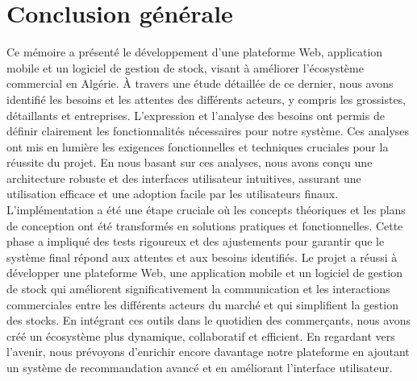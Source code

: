 \documentclass[edit,12pt,a4paper,ChapStyle,oneside,doubleinterligne]{report}
\begin{document}
\chapter{Conclusion générale}
Ce mémoire a présenté le développement d'une plateforme Web, application mobile et un logiciel de gestion de stock, visant à améliorer l'écosystème commercial en Algérie. À travers une étude détaillée de ce dernier, nous avons identifié les besoins et les attentes des différents acteurs, y compris les grossistes, détaillants et entreprises.
\newline\newline
L'expression et l'analyse des besoins ont permis de définir clairement les fonctionnalités nécessaires pour notre système. Ces analyses ont mis en lumière les exigences fonctionnelles et techniques cruciales pour la réussite du projet. En nous basant sur ces analyses, nous avons conçu une architecture robuste et des interfaces utilisateur intuitives, assurant une utilisation efficace et une adoption facile par les utilisateurs finaux.
\newline \newline
L'implémentation a été une étape cruciale où les concepts théoriques et les plans de conception ont été transformés en solutions pratiques et fonctionnelles. Cette phase a impliqué des tests rigoureux et des ajustements pour garantir que le système final répond aux attentes et aux besoins identifiés.
\newline \newline
Le projet a réussi à développer une plateforme Web, une application mobile et un logiciel de gestion de stock qui améliorent significativement la communication et les interactions commerciales entre les différents acteurs du marché et qui simplifient la gestion des stocks. En intégrant ces outils dans le quotidien des commerçants, nous avons créé un écosystème plus dynamique, collaboratif et efficient.
\newline \newline
En regardant vers l'avenir, nous prévoyons d'enrichir encore davantage notre plateforme en ajoutant un système de recommandation avancé et en améliorant l'interface utilisateur.
\end{document}
